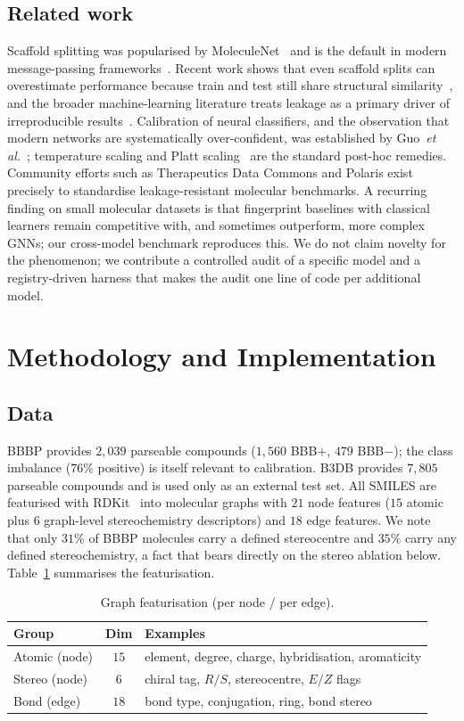 \documentclass[conference]{IEEEtran}
\begin{document}
\subsection{Related work}
Scaffold splitting was popularised by MoleculeNet~\cite{wu2018} and is the default
in modern message-passing frameworks~\cite{yang2019}. Recent work shows that even
scaffold splits can overestimate performance because train and test still share
structural similarity~\cite{tilden2024}, and the broader machine-learning
literature treats leakage as a primary driver of irreproducible
results~\cite{kapoor2023}. Calibration of neural classifiers, and the observation
that modern networks are systematically over-confident, was established by
Guo~\emph{et al.}~\cite{guo2017}; temperature scaling and Platt
scaling~\cite{platt1999} are the standard post-hoc remedies. Community efforts
such as Therapeutics Data Commons and Polaris exist precisely to standardise
leakage-resistant molecular benchmarks. A recurring finding on small molecular
datasets is that fingerprint baselines with classical learners remain competitive
with, and sometimes outperform, more complex GNNs; our cross-model benchmark
reproduces this. We do not claim novelty for the phenomenon; we contribute a
controlled audit of a specific model and a registry-driven harness that makes the
audit one line of code per additional model.

\section{Methodology and Implementation}

\subsection{Data}
BBBP provides $2{,}039$ parseable compounds ($1{,}560$ BBB$+$, $479$ BBB$-$); the
class imbalance ($76\%$ positive) is itself relevant to calibration. B3DB provides
$7{,}805$ parseable compounds and is used only as an external test set. All SMILES
are featurised with RDKit~\cite{rdkit} into molecular graphs with $21$ node
features ($15$ atomic plus $6$ graph-level stereochemistry descriptors) and $18$
edge features. We note that only $31\%$ of BBBP molecules carry a defined
stereocentre and $35\%$ carry any defined stereochemistry, a fact that bears
directly on the stereo ablation below. Table~\ref{tab:feat} summarises the
featurisation.

\begin{table}[t]
\caption{Graph featurisation (per node / per edge).}
\label{tab:feat}
\centering
\begin{tabular}{lcl}
\toprule
Group & Dim & Examples \\
\midrule
Atomic (node)   & $15$ & element, degree, charge, hybridisation, aromaticity \\
Stereo (node)   & $6$  & chiral tag, $R/S$, stereocentre, $E/Z$ flags \\
Bond (edge)     & $18$ & bond type, conjugation, ring, bond stereo \\
\bottomrule
\end{tabular}
\end{table}
\end{document}
